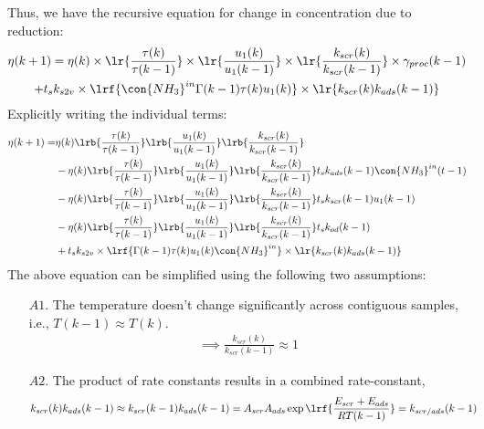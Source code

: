 Thus, we have the recursive equation for change in concentration due to reduction:
\begin{multline}
        \eta(k+1) = \eta(k) \times \lr{\frac{\tau(k)}{\tau(k-1)}}
                                \times \lr{\frac{u_1(k)}{u_1(k-1)}}
                                \times \lr{\frac{k_{scr}(k)}{k_{scr}(k-1)}}
                                \times \gamma_{proc}(k-1)
                                \\
                        + t_s k_{s2v} \times \lrf{\con{NH_3}^{in} \Gamma(k-1) \tau(k) u_1(k)} \times \lr{k_{scr}(k) k_{ads}(k-1)}
\end{multline}
Explicitly writing the individual terms:
\begin{align*}
        \eta(k+1) =& \eta(k) \lrb{\frac{\tau(k)}{\tau(k-1)}}
                                \lrb{\frac{u_1(k)}{u_1(k-1)}}
                                \lrb{\frac{k_{scr}(k)}{k_{scr}(k-1)}} \\
                &-\eta(k) \lrb{\frac{\tau(k)}{\tau(k-1)}}
                                \lrb{\frac{u_1(k)}{u_1(k-1)}}
                                \lrb{\frac{k_{scr}(k)}{k_{scr}(k-1)}}
                t_s k_{ads}(k-1) \con{NH_3}^{in}(t-1)
                \\
                &-\eta(k) \lrb{\frac{\tau(k)}{\tau(k-1)}}
                                \lrb{\frac{u_1(k)}{u_1(k-1)}}
                                \lrb{\frac{k_{scr}(k)}{k_{scr}(k-1)}}
                t_s k_{scr}(k-1) u_1(k-1)
                \\
                &-\eta(k) \lrb{\frac{\tau(k)}{\tau(k-1)}}
                                \lrb{\frac{u_1(k)}{u_1(k-1)}}
                                \lrb{\frac{k_{scr}(k)}{k_{scr}(k-1)}}
                t_s k_{od}(k-1)
                \\
                &+ t_s k_{s2v} \times \lrf{\Gamma(k-1) \tau(k) u_1(k) \con{NH_3}^{in}} \times \lr{k_{scr}(k) k_{ads}(k-1)}
\end{align*}
\begin{equation}
       \label{eqn::nox_reduction_govern}
\end{equation}
The above equation can be simplified using the following two assumptions:
\begin{itemize}
        \item[$A1.$] The temperature doesn't change significantly across contiguous samples, i.e., $T(k-1) \approx T(k)$.
        \begin{align}
                \implies \frac{k_{scr}(k)}{k_{scr}(k-1)} \approx 1
        \end{align}
        \item[$A2.$] The product of rate constants results in a combined rate-constant,
        \begin{align}
                k_{scr}(k) k_{ads}(k-1) &\approx k_{scr}(k-1) k_{ads}(k-1)  = A_{scr}A_{ads} \exp\lrf{\frac{E_{scr}+E_{ads}}{R T(k-1)}} = k_{scr/ads}(k-1)
        \end{align}
\end{itemize}
